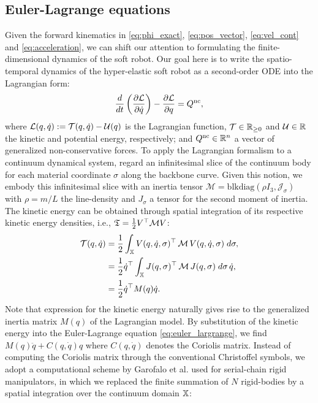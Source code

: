 {\subsection{Euler-Lagrange equations}
\noindent Given the forward kinematics in \eqref{eq:phi_exact}, \eqref{eq:pos_vector}, \eqref{eq:vel_cont} and \eqref{eq:acceleration}, we can shift our attention to formulating the finite-dimensional dynamics of the soft robot. Our goal here is to write the spatio-temporal dynamics of the hyper-elastic soft robot as a second-order ODE into the Lagrangian form:
%
\begin{equation}
\frac{d}{d t}\left(\frac{\partial \mathcal{L}}{\partial \dot{{q}}}\right) - \frac{\partial \mathcal{L}}{\partial {q}} = {Q}^{\nc}, \label{eq:euler_largrange}
\end{equation}
%
\noindent where $\mathcal{L}({q},\dot{q}) := \mathcal{T}(q,\dot{q}) - \mathcal{U}(q)$ is the Lagrangian function, $\mathcal{T} \in \mathbb{R}_{\ge0}$ and $\mathcal{U}\in \mathbb{R}$ the kinetic and potential energy, respectively; and $Q^{\textnormal{nc}} \in \mathbb{R}^n$ a vector of generalized non-conservative forces. To apply the Lagrangian formalism to a continuum dynamical system, regard an infinitesimal slice of the continuum body for each material coordinate $\sigma$ along the backbone curve. Given this notion, we embody this infinitesimal slice with an inertia tensor $
\mathcal{M} = \text{blkdiag}(\rho I_3,\mathcal{J_\sigma})$ with $\rho = m/L$ the line-density and $J_\sigma$ a tensor for the second moment of inertia. The kinetic energy can be obtained through spatial integration of its respective kinetic energy densities\cite{Boyer2010,Mochiyama2003,Tatlicioglu2007}, i.e., $\mathfrak{T} = \frac{1}{2}V^\top \mathcal{M} V
$:
%
\begin{align}
\mathcal{T}({q},\dot{{q}}) & = \frac{1}{2}\int_\Xs {V}({q},\dot{q},\sigma)^\top\,\mathcal{M}\,{V}({q},\dot{{q}},\sigma) \; d \sigma,
 \notag \\
& =  \frac{1}{2} \dot{q}^\top \int_\Xs  J({q},\sigma)^\top\,\mathcal{M}\, J({q},\sigma) \; d \sigma \, \dot{q}, \notag \\
& = \frac{1}{2}\dot{q}^\top M(q) \dot{q}. \label{eq:kinetic_energy}
\end{align}
%
Note that expression for the kinetic energy naturally gives rise to the generalized inertia matrix $M(q)$ of the Lagrangian model. By substitution of the kinetic energy into the Euler-Lagrange equation \eqref{eq:euler_largrange}, we find $M(q)\ddot{q} + C(q,\dot{q})q$ where $C(q,\dot{q})$ denotes the Coriolis matrix. Instead of computing the Coriolis matrix through the conventional Christoffel symbols\cite{Murray1994}, we adopt a computational scheme by Garofalo et al. \cite{Garofalo2013} used for serial-chain rigid manipulators, in which we replaced the finite summation of $N$ rigid-bodies by a spatial integration over the continuum domain $\mathbb{X}$:
}
